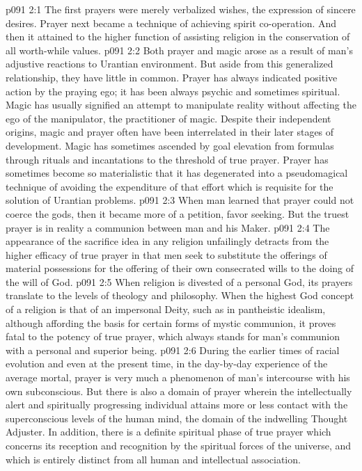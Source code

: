 \vs p091 2:1 The first prayers were merely verbalized wishes, the expression of sincere desires. Prayer next became a technique of achieving spirit co\hyp{}operation. And then it attained to the higher function of assisting religion in the conservation of all worth\hyp{}while values.
\vs p091 2:2 Both prayer and magic arose as a result of man’s adjustive reactions to Urantian environment. But aside from this generalized relationship, they have little in common. Prayer has always indicated positive action by the praying ego; it has been always psychic and sometimes spiritual. Magic has usually signified an attempt to manipulate reality without affecting the ego of the manipulator, the practitioner of magic. Despite their independent origins, magic and prayer often have been interrelated in their later stages of development. Magic has sometimes ascended by goal elevation from formulas through rituals and incantations to the threshold of true prayer. Prayer has sometimes become so materialistic that it has degenerated into a pseudomagical technique of avoiding the expenditure of that effort which is requisite for the solution of Urantian problems.
\vs p091 2:3 \pc When man learned that prayer could not coerce the gods, then it became more of a petition, favor seeking. But the truest prayer is in reality a communion between man and his Maker.
\vs p091 2:4 \pc The appearance of the sacrifice idea in any religion unfailingly detracts from the higher efficacy of true prayer in that men seek to substitute the offerings of material possessions for the offering of their own consecrated wills to the doing of the will of God.
\vs p091 2:5 When religion is divested of a personal God, its prayers translate to the levels of theology and philosophy. When the highest God concept of a religion is that of an impersonal Deity, such as in pantheistic idealism, although affording the basis for certain forms of mystic communion, it proves fatal to the potency of true prayer, which always stands for man’s communion with a personal and superior being.
\vs p091 2:6 During the earlier times of racial evolution and even at the present time, in the day\hyp{}by\hyp{}day experience of the average mortal, prayer is very much a phenomenon of man’s intercourse with his own subconscious. But there is also a domain of prayer wherein the intellectually alert and spiritually progressing individual attains more or less contact with the superconscious levels of the human mind, the domain of the indwelling Thought Adjuster. In addition, there is a definite spiritual phase of true prayer which concerns its reception and recognition by the spiritual forces of the universe, and which is entirely distinct from all human and intellectual association.
